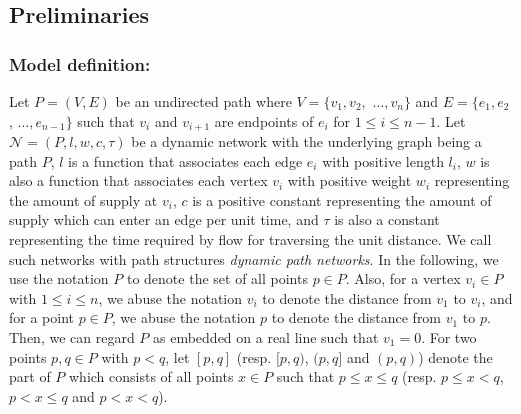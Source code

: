 \documentclass[a4paper]{llncs}
\begin{document}
\subsection{Preliminaries}
\label{sec:mmp}

\subsubsection{Model definition:}
Let $P =(V, E)$ be an undirected path where $V = \{ v_1, v_2,$ $\ldots, v_n \}$ and $E = \{ e_1, e_2$, $\ldots, e_{n-1} \}$ 
such that $v_i$ and $v_{i+1}$ are endpoints of $e_i$ for $1 \le i \le n-1$.
Let $\mathcal{N} = (P, l, w, c, \tau)$ be a dynamic network 
with the underlying graph being a path $P$,
$l$ is a function that associates each edge $e_i$ with positive length $l_i$, 
$w$ is also a function that associates each vertex $v_i$ with positive weight $w_i$ representing the amount of supply at $v_i$,
$c$ is a positive constant representing the amount of supply which can enter an edge per unit time,
and $\tau$ is also a constant representing the time required by flow for traversing the unit distance.
We call such networks with path structures {\it dynamic path networks}.
In the following, we use the notation $P$ to denote the set of all points $p \in P$.
Also, for a vertex $v_i \in P$ with $1 \le i \le n$, we abuse the notation $v_i$ to denote the distance from $v_1$ to $v_i$,
and for a point $p \in P$, we abuse the notation $p$ to denote the distance from $v_1$ to $p$.
Then, we can regard $P$ as embedded on a real line such that $v_1 = 0$.
For two points $p, q \in P$ with $p < q$, 
let $[p, q]$ (resp. $[p, q)$, $(p, q]$ and $(p, q)$) denote the part of $P$ which consists of all points $x \in P$ 
such that $p \le x \le q$ (resp. $p \le x < q$, $p < x \le q$ and $p < x < q$).
\end{document}
